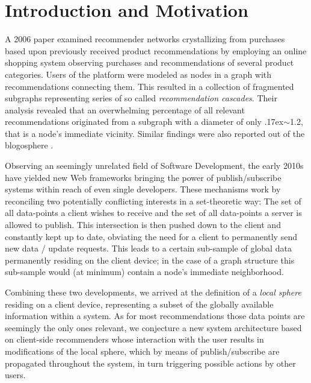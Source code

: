\documentclass{llncs}
\begin{document}
\renewcommand{\thesubfigure}{\thefigure.\arabic{subfigure}}
\makeatletter
\renewcommand{\p@subfigure}{}
\renewcommand{\@thesubfigure}{\thesubfigure:\hskip\subfiglabelskip}
\makeatother



\section{Introduction and Motivation}
\label{sect:intro_motivation}

A 2006 paper \cite{leskovec2006recpatterns} examined recommender networks crystallizing from purchases based upon previously received product recommendations by employing an online shopping system observing purchases and recommendations of several product categories. Users of the platform were modeled as nodes in a graph with recommendations connecting them. This resulted in a collection of fragmented subgraphs representing series of so called \textit{recommendation cascades}. Their analysis revealed that an overwhelming percentage of all relevant recommendations originated from a subgraph with a diameter of only {\raise.17ex\hbox{$\scriptstyle\sim$}}1.2, that is a node's immediate vicinity. Similar findings were also reported out of the blogosphere \cite{leskovec2007blogpatterns}.

Observing an seemingly unrelated field of Software Development, the early 2010s have yielded new Web frameworks bringing the power of publish/subscribe systems within reach of even single developers. These mechanisms work by reconciling two potentially conflicting interests in a set-theoretic way: The set of all data-points a client wishes to receive and the set of all data-points a server is allowed to publish. This intersection is then pushed down to the client and constantly kept up to date, obviating the need for a client to permanently send new data / update requests. This leads to a certain sub-sample of global data permanently residing on the client device; in the case of a graph structure this sub-sample would (at minimum) contain a node's immediate neighborhood.

Combining these two developments, we arrived at the definition of a \textit{local sphere} residing on a client device, representing a subset of the globally available information within a system. As for most recommendations those data points are seemingly the only ones relevant, we conjecture a new system architecture based on client-side recommenders whose interaction with the user results in modifications of the local sphere, which by means of publish/subscribe are propagated throughout the system, in turn triggering possible actions by other users.
\end{document}

